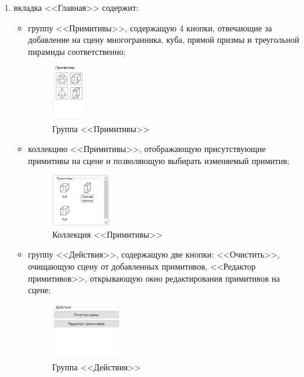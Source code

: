 \begin{enumerate}
	\item вкладка <<Главная>> содержит:
	\begin{itemize}[label=--]
		\item группу <<Примитивы>>, содержащую 4 кнопки, отвечающие за добавление на сцену многогранника, куба, прямой призмы и треугольной пирамиды соответственно;
		\begin{figure}[h] 
			\centering
			\includegraphics[width=0.15\textwidth]{images/primitives-buttons.png}
			\caption{Группа <<Примитивы>>} 
			\label{fig:primitives-buttons} 
		\end{figure}
		\item коллекцию <<Примитивы>>, отображающую присутствующие примитивы на сцене и позволяющую выбирать изменяемый примитив;
		\begin{figure}[h] 
			\centering
			\includegraphics[width=0.25\textwidth]{images/primitives-list.png}
			\caption{Коллекция <<Примитивы>>} 
			\label{fig:primitives-list} 
		\end{figure}
		\item группу <<Действия>>, содержащую две кнопки: <<Очистить>>, очищающую сцену от добавленных примитивов, <<Редактор примитивов>>, открывающую окно редактирования примитивов на сцене;
		\begin{figure}[h] 
			\centering
			\includegraphics[width=0.3\textwidth]{images/actions.png}
			\caption{Группа <<Действия>>} 
			\label{fig:actions} 
		\end{figure}

\end{itemize}
\end{enumerate}
